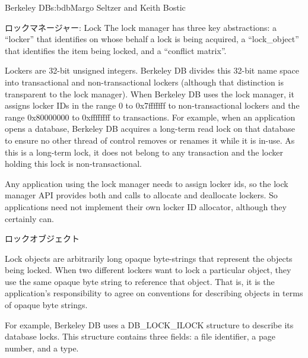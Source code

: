 \begin{aosachapter}{Berkeley DB}{s:bdb}{Margo Seltzer and Keith Bostic}
\begin{aosasect1}{ロックマネージャー: Lock}
The lock manager has three key abstractions: a ``locker'' that identifies
on whose behalf a lock is being acquired, a ``lock\_object'' that
identifies the item being locked, and a ``conflict matrix''.

Lockers are 32-bit unsigned integers. Berkeley DB divides this 32-bit
name space into transactional and non-transactional lockers (although
that distinction is transparent to the lock manager).  When Berkeley
DB uses the lock manager, it assigns locker IDs in the range 0 to
0x7fffffff to non-transactional lockers and the range 0x80000000 to
0xffffffff to transactions. For example, when an application opens a
database, Berkeley DB acquires a long-term read lock on that database
to ensure no other thread of control removes or renames it while it is
in-use. As this is a long-term lock, it does not belong to any
transaction and the locker holding this lock is non-transactional.

Any application using the lock manager needs to assign locker ids, so
the lock manager API provides both 
and  calls to allocate and
deallocate lockers.  So applications need not implement
their own locker ID allocator, although they certainly can.

\begin{aosasect2}{ロックオブジェクト}

Lock objects are arbitrarily long opaque byte-strings that represent
the objects being locked. When two different lockers want to lock a
particular object, they use the same opaque byte string to reference
that object.  That is, it is the application's responsibility to agree
on conventions for describing objects in terms of opaque byte strings.

For example, Berkeley DB uses a DB\_LOCK\_ILOCK structure to describe
its database locks. This structure contains three fields: a file
identifier, a page number, and a type.


\end{aosasect2}
\end{aosasect1}
\end{aosachapter}
